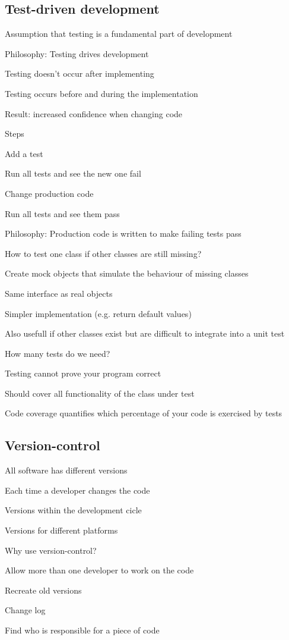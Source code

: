 \subsection{Test-driven development}
\enumstart
	\item Assumption that testing is a fundamental part of development
	\item Philosophy: Testing drives development
	\enumstart
		\item Testing doesn't occur after implementing
		\item Testing occurs before and during the implementation
	\enumend
	\item Result: increased confidence when changing code
	\item Steps
	\enumstart
		\item Add a test
		\item Run all tests and see the new one fail
		\item Change production code
		\item Run all tests and see them pass
	\enumend
	\item Philosophy: Production code is written to make failing tests pass
	\item How to test one class if other classes are still missing?
	\enumstart
		\item Create mock objects that simulate the behaviour of missing classes
		\item Same interface as real objects
		\item Simpler implementation (e.g. return default values)
		\item Also usefull if other classes exist but are difficult to integrate into a unit test
	\enumend
	\item How many tests do we need?
	\enumstart
		\item Testing cannot prove your program correct
		\item Should cover all functionality of the class under test
		\item Code coverage quantifies which percentage of your code is exercised by tests
	\enumend
\enumend

\subsection{Version-control}
\enumstart
	\item All software has different versions
	\enumstart
		\item Each time a developer changes the code
		\item Versions within the development cicle
		\item Versions for different platforms
	\enumend
	\item Why use version-control?
	\enumstart
		\item Allow more than one developer to work on the code
		\item Recreate old versions
		\item Change log
		\item Find who is responsible for a piece of code
	\enumend
\enumend
